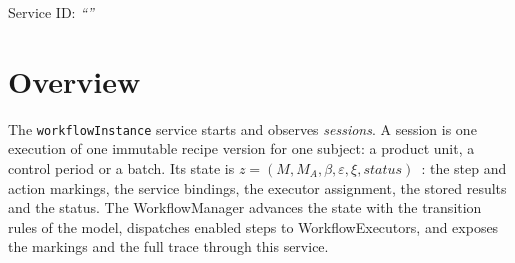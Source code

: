 \documentclass[a4paper]{arrowhead}
\begin{document}
\ArrowheadSetup

\begin{center}
  \vspace*{1cm}
  \huge{\arrowtitle}

  \vspace*{0.2cm}
  \LARGE{\arrowtype}
  \vspace*{1cm}

  \Large{Service ID: \textit{``\arrowid''}}
  \vspace*{\fill}

  

  \vspace*{1cm}
  \vspace*{\fill}

  \begin{abstract}
    This document describes the \texttt{workflowInstance} service of the Eclipse Arrowhead workflow support systems, which starts, observes and aborts workflow sessions. It is provided by the WorkflowManager system, service version 1.0.0, documentation edition 5.4.0.
  \end{abstract}

  \vspace*{1cm}
\end{center}

\newpage

\tableofcontents
\newpage

\section{Overview}
\label{sec:overview}
The \texttt{workflowInstance} service starts and observes \emph{sessions}. A session is one
execution of one immutable recipe version for one subject: a product unit, a control period or a batch. Its state is
$z = (M, M_A, \beta, \varepsilon, \xi, status)$~\cite{varga2026}: the step and action markings, the service bindings,
the executor assignment, the stored results and the status. The WorkflowManager advances the state with the transition
rules of the model, dispatches enabled steps to WorkflowExecutors, and exposes the markings and the full trace through
this service.
\end{document}
